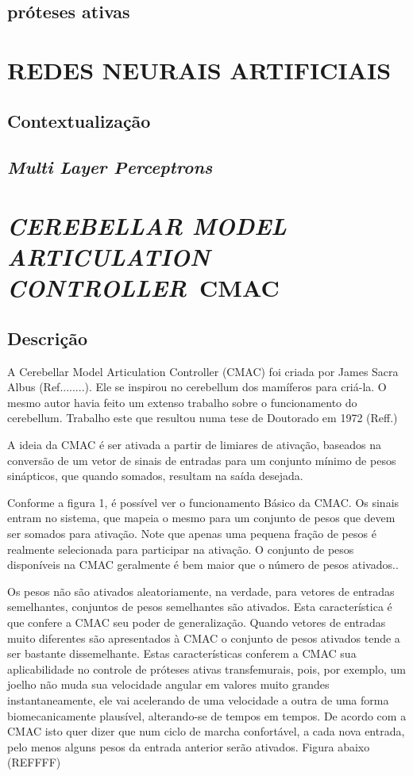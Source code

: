 \documentclass[a4paper, 12pt] {report}
\begin{document}
			\subsection {próteses ativas}
		\section{REDES NEURAIS ARTIFICIAIS}
			\subsection{Contextualização}
			\subsection{\emph{Multi Layer Perceptrons}}

		\section{\emph{CEREBELLAR MODEL ARTICULATION CONTROLLER}\ CMAC}
			\subsection{Descrição}
A Cerebellar Model Articulation Controller (CMAC) foi criada por James Sacra Albus (Ref........). Ele se inspirou no cerebellum dos mamíferos para criá-la. O mesmo autor havia feito um extenso trabalho sobre o funcionamento do cerebellum. Trabalho este que resultou numa tese de Doutorado em 1972 (Reff.)

A ideia da CMAC é ser ativada a partir de limiares de ativação, baseados na conversão de um vetor de sinais de entradas para um conjunto mínimo de pesos sinápticos, que quando somados, resultam na saída desejada.

	Conforme a figura 1, é possível ver o funcionamento Básico da CMAC. Os sinais entram no sistema, que mapeia o mesmo para um conjunto de pesos que devem ser somados para ativação. Note que apenas uma pequena fração de pesos é realmente selecionada para participar na ativação. O conjunto de pesos disponíveis na CMAC geralmente é bem maior que o número de pesos ativados..

	Os pesos não são ativados aleatoriamente, na verdade, para vetores de entradas semelhantes, conjuntos de pesos semelhantes são ativados. Esta característica é que confere a CMAC seu poder de generalização. Quando vetores de entradas muito diferentes são apresentados à CMAC o conjunto de pesos ativados tende a ser bastante dissemelhante. Estas características conferem a CMAC sua aplicabilidade no controle de próteses ativas transfemurais, pois, por exemplo, um joelho não muda sua velocidade angular em valores muito grandes instantaneamente, ele vai acelerando de uma velocidade a outra de uma forma biomecanicamente plausível, alterando-se de tempos em tempos. De acordo com a CMAC isto quer dizer que num ciclo de marcha confortável, a cada nova entrada, pelo menos alguns pesos da entrada anterior serão ativados. Figura abaixo (REFFFF)
\end{document}
